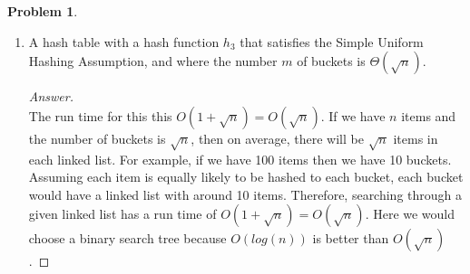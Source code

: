 \documentclass[11pt]{article}
\theoremstyle{definition}
\theoremstyle{definition}
\newtheorem{required}{Problem}
\theoremstyle{definition}
\begin{document}
\begin{required}
\begin{enumerate}[label=(\alph*)]
\vskip 15pt	
\item A hash table with a hash function $h_3$ that satisfies the Simple Uniform Hashing Assumption, and where the number $m$ of buckets is $\Theta(\sqrt{n})$.

\begin{proof}[Answer] $ $\\
The run time for this this $O(1+\sqrt{n}) = O(\sqrt{n})$. If we have $n$ items and the number of buckets is $\sqrt{n}$, then on average, there will be $\sqrt{n}$ items in each linked list. For example, if we have 100 items then we have 10 buckets. Assuming each item is equally likely to be hashed to each bucket, each bucket would have a linked list with around 10 items. Therefore, searching through a given linked list has a run time of $O(1+\sqrt{n}) = O(\sqrt{n})$. Here we would choose a binary search tree because $O(log(n))$ is better than $O(\sqrt{n})$.
\end{proof}

\end{enumerate}
\end{required}
\end{document}
